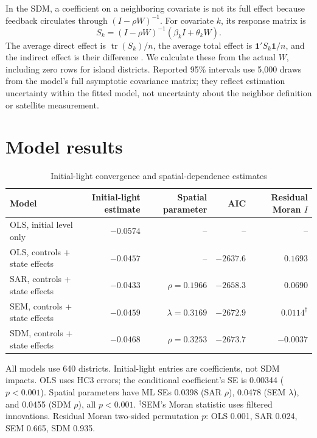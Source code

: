 \documentclass[11pt,a4paper]{article}
\begin{document}
In the SDM, a coefficient on a neighboring covariate is not its full effect because feedback circulates through $(I-\rho W)^{-1}$. For covariate $k$, its response matrix is
\begin{equation}
S_k=(I-\rho W)^{-1}(\beta_k I+\theta_k W).
\end{equation}
The average direct effect is $\operatorname{tr}(S_k)/n$, the average total effect is $\mathbf{1}'S_k\mathbf{1}/n$, and the indirect effect is their difference \cite{pysalimpact}. We calculate these from the actual $W$, including zero rows for island districts. Reported 95\% intervals use 5,000 draws from the model's full asymptotic covariance matrix; they reflect estimation uncertainty within the fitted model, not uncertainty about the neighbor definition or satellite measurement.

\section{Model results}
\begin{table}[htbp]
\centering\small
\caption{Initial-light convergence and spatial-dependence estimates}
\begin{tabular}{lrrrr}
\toprule
Model & Initial-light estimate & Spatial parameter & AIC & Residual Moran $I$\\
\midrule
OLS, initial level only & $-0.0574$ & -- & -- & --\\
OLS, controls + state effects & $-0.0457$ & -- & $-2637.6$ & $0.1693$\\
SAR, controls + state effects & $-0.0433$ & $\rho=0.1966$ & $-2658.3$ & $0.0690$\\
SEM, controls + state effects & $-0.0459$ & $\lambda=0.3169$ & $-2672.9$ & $0.0114^{\dagger}$\\
SDM, controls + state effects & $-0.0468$ & $\rho=0.3253$ & $-2673.7$ & $-0.0037$\\
\bottomrule
\end{tabular}
\begin{minipage}{0.96\linewidth}\footnotesize\vspace{2mm}
All models use 640 districts. Initial-light entries are coefficients, not SDM impacts. OLS uses HC3 errors; the conditional coefficient's SE is 0.00344 ($p<0.001$). Spatial parameters have ML SEs 0.0398 (SAR $\rho$), 0.0478 (SEM $\lambda$), and 0.0455 (SDM $\rho$), all $p<0.001$. $^{\dagger}$SEM's Moran statistic uses filtered innovations. Residual Moran two-sided permutation $p$: OLS 0.001, SAR 0.024, SEM 0.665, SDM 0.935.
\end{minipage}
\label{tab:models}
\end{table}
\end{document}
